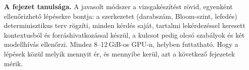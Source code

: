\bigskip
\noindent\textbf{A fejezet tanulsága.} A javasolt módszer a vizsgakészítést rövid, egyenként
ellenőrizhető lépésekre bontja: a szerkezetet (darabszám, Bloom-szint, lefedés) determinisztikus terv
rögzíti, minden kérdés saját, tartalmi lekérdezéssel keresett kontextusból és forráshivatkozással
készül, a kulcsot pedig olcsó szabályok és két modellhívás ellenőrzi. Mindez 8--12\,GiB-os GPU-n, helyben
futtatható. Hogy a lépések közül melyik mennyit ér, és mennyibe kerül, azt a következő fejezetek mérik.
